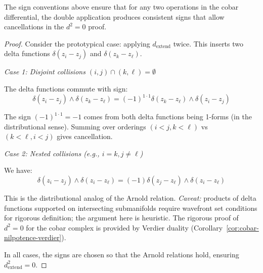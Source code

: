 \begin{lemma}\label{lem:cobar-sign-consistency}
The sign conventions above ensure that for any two operations in the cobar differential, 
the double application produces consistent signs that allow cancellations in the 
$d^2 = 0$ proof.
\end{lemma}

\begin{proof}
Consider the prototypical case: applying $d_{\text{extend}}$ twice. This inserts 
two delta functions $\delta(z_i - z_j)$ and $\delta(z_k - z_\ell)$.

\emph{Case 1: Disjoint collisions $(i,j) \cap (k,\ell) = \emptyset$}

The delta functions commute with sign:
\[\delta(z_i - z_j) \wedge \delta(z_k - z_\ell) = (-1)^{1 \cdot 1} \delta(z_k - z_\ell) 
\wedge \delta(z_i - z_j)\]

The sign $(-1)^{1 \cdot 1} = -1$ comes from both delta functions being 1-forms 
(in the distributional sense). Summing over orderings $(i<j, k<\ell)$ vs $(k<\ell, i<j)$ 
gives cancellation.

\emph{Case 2: Nested collisions (e.g., $i=k, j \neq \ell$)}

We have:
\[\delta(z_i - z_j) \wedge \delta(z_i - z_\ell) = (-1) \delta(z_j - z_\ell)
\wedge \delta(z_i - z_\ell)\]

This is the distributional analog of the Arnold relation.  \emph{Caveat:} products of delta functions supported on intersecting submanifolds require wavefront set conditions for rigorous definition; the argument here is heuristic.  The rigorous proof of $d^2 = 0$ for the cobar complex is provided by Verdier duality (Corollary~\ref{cor:cobar-nilpotence-verdier}).

In all cases, the signs are chosen so that the Arnold relations
hold, ensuring $d_{\text{extend}}^2 = 0$.
\end{proof}

